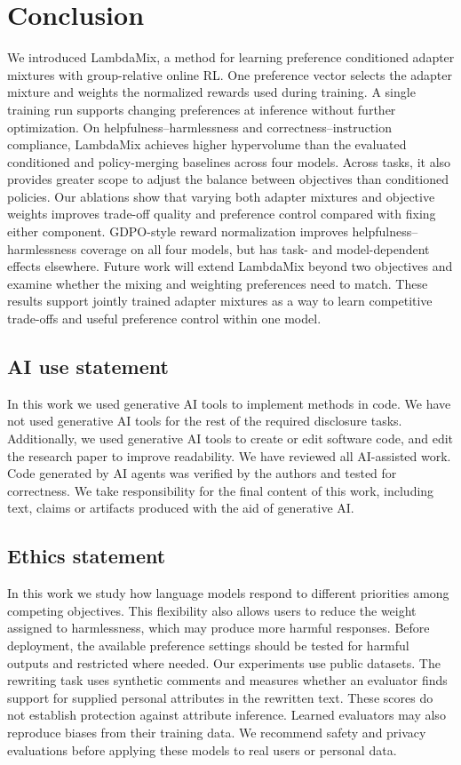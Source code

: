 \documentclass{article} %
\begin{document}
\section{Conclusion}
We introduced LambdaMix, a method for learning preference conditioned adapter mixtures with group-relative online RL. One preference vector selects the adapter mixture and weights the normalized rewards used during training. A single training run supports changing preferences at inference without further optimization. On helpfulness–harmlessness and correctness–instruction compliance, LambdaMix achieves higher hypervolume than the evaluated conditioned and policy-merging baselines across four models. Across tasks, it also provides greater scope to adjust the balance between objectives than conditioned policies. Our ablations show that varying both adapter mixtures and objective weights improves trade-off quality and preference control compared with fixing either component. GDPO-style reward normalization improves helpfulness–harmlessness coverage on all four models, but has task- and model-dependent effects elsewhere. Future work will extend LambdaMix beyond two objectives and examine whether the mixing and weighting preferences need to match. These results support jointly trained adapter mixtures as a way to learn competitive trade-offs and useful preference control within one model.


\clearpage
\subsection*{AI use statement}

In this work we used generative AI tools to implement methods in code. We have not used generative AI tools for the rest of the required disclosure tasks. Additionally, we used generative AI tools to create or edit software code, and edit the research paper to improve readability. We have reviewed all AI-assisted work. Code generated by AI agents was verified by the authors and tested for correctness. We take responsibility for the final content of this work, including text, claims or artifacts produced with the aid of generative AI.

\subsection*{Ethics statement}

In this work we study how language models respond to different priorities among competing objectives. This flexibility also allows users to reduce the weight assigned to harmlessness, which may produce more harmful responses. Before deployment, the available preference settings should be tested for harmful outputs and restricted where needed. Our experiments use public datasets. The rewriting task uses synthetic comments and measures whether an evaluator finds support for supplied personal attributes in the rewritten text. These scores do not establish protection against attribute inference. Learned evaluators may also reproduce biases from their training data. We recommend safety and privacy evaluations before applying these models to real users or personal data.
\end{document}
